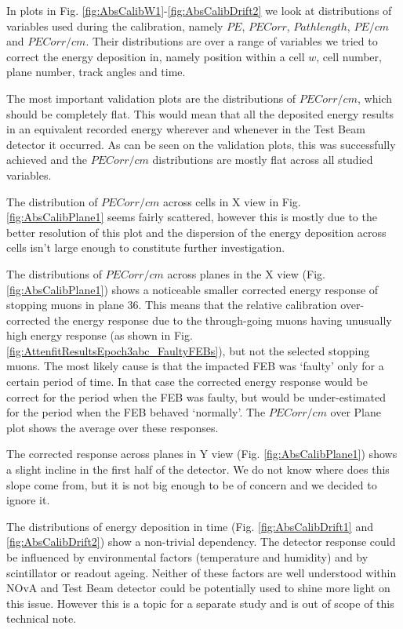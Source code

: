 In plots in Fig. \ref{fig:AbsCalibW1}-\ref{fig:AbsCalibDrift2} we look at distributions of variables used during the calibration, namely $PE$, $PECorr$, $Pathlength$, $PE/cm$ and $PECorr/cm$. Their distributions are over a range of variables we tried to correct the energy deposition in, namely position within a cell $w$, cell number, plane number, track angles and time.

The most important validation plots are the distributions of $PECorr/cm$, which should be completely flat. This would mean that all the deposited energy results in an equivalent recorded energy wherever and whenever in the Test Beam detector it occurred. As can be seen on the validation plots, this was successfully achieved and the $PECorr/cm$ distributions are mostly flat across all studied variables.

The distribution of $PECorr/cm$ across cells in X view in Fig. \ref{fig:AbsCalibPlane1} seems fairly scattered, however this is mostly due to the better resolution of this plot and the dispersion of the energy deposition across cells isn't large enough to constitute further investigation.

The distributions of $PECorr/cm$ across planes in the X view (Fig. \ref{fig:AbsCalibPlane1}) shows a noticeable smaller corrected energy response of stopping muons in plane 36. This means that the relative calibration over-corrected the energy response due to the through-going muons having unusually high energy response (as shown in Fig. \ref{fig:AttenfitResultsEpoch3abc_FaultyFEBs}), but not the selected stopping muons. The most likely cause is that the impacted FEB was `faulty' only for a certain period of time. In that case the corrected energy response would be correct for the period when the FEB was faulty, but would be under-estimated for the period when the FEB behaved `normally'. The $PECorr/cm$ over Plane plot shows the average over these responses.

The corrected response across planes in Y view (Fig. \ref{fig:AbsCalibPlane1}) shows a slight incline in the first half of the detector. We do not know where does this slope come from, but it is not big enough to be of concern and we decided to ignore it.

The distributions of energy deposition in time (Fig. \ref{fig:AbsCalibDrift1} and \ref{fig:AbsCalibDrift2}) show a non-trivial dependency. The detector response could be influenced by environmental factors (temperature and humidity) and by scintillator or readout ageing. Neither of these factors are well understood within NOvA and Test Beam detector could be potentially used to shine more light on this issue. However this is a topic for a separate study and is out of scope of this technical note.

